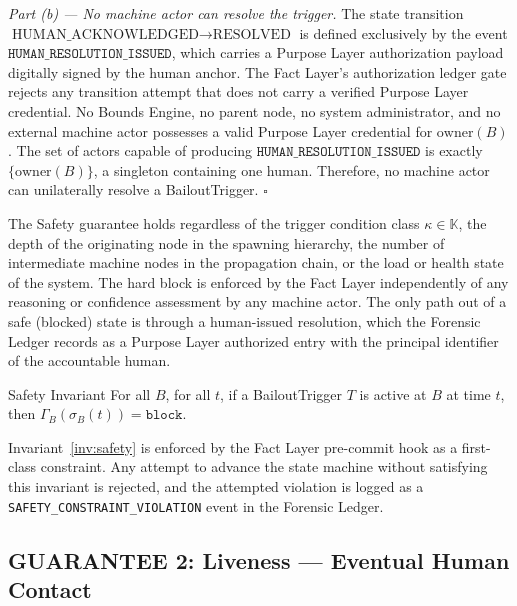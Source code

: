 \medskip

\noindent\textit{Part (b) — No machine actor can resolve the trigger.} The state transition $\text{HUMAN\_ACKNOWLEDGED} \rightarrow \text{RESOLVED}$ is defined exclusively by the event $\texttt{HUMAN\_RESOLUTION\_ISSUED}$, which carries a Purpose Layer authorization payload digitally signed by the human anchor. The Fact Layer's authorization ledger gate rejects any transition attempt that does not carry a verified Purpose Layer credential. No Bounds Engine, no parent node, no system administrator, and no external machine actor possesses a valid Purpose Layer credential for $\text{owner}(B)$. The set of actors capable of producing $\texttt{HUMAN\_RESOLUTION\_ISSUED}$ is exactly $\{\text{owner}(B)\}$, a singleton containing one human. Therefore, no machine actor can unilaterally resolve a BailoutTrigger. $\square$

\bigskip

The Safety guarantee holds regardless of the trigger condition class $\kappa \in \mathbb{K}$, the depth of the originating node in the spawning hierarchy, the number of intermediate machine nodes in the propagation chain, or the load or health state of the system. The hard block is enforced by the Fact Layer independently of any reasoning or confidence assessment by any machine actor. The only path out of a safe (blocked) state is through a human-issued resolution, which the Forensic Ledger records as a Purpose Layer authorized entry with the principal identifier of the accountable human.

\begin{invariant}{Safety Invariant}
\label{inv:safety}
For all $B$, for all $t$, if a BailoutTrigger $T$ is active at $B$ at time $t$, then $\Gamma_B(\sigma_B(t)) = \texttt{block}$.
\end{invariant}

Invariant~\ref{inv:safety} is enforced by the Fact Layer pre-commit hook as a first-class constraint. Any attempt to advance the state machine without satisfying this invariant is rejected, and the attempted violation is logged as a \texttt{SAFETY\_CONSTRAINT\_VIOLATION} event in the Forensic Ledger.

\subsection{GUARANTEE 2: Liveness — Eventual Human Contact}
\label{sec:guarantee-liveness}

